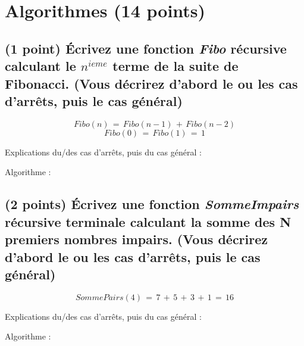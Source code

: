 \documentclass[11pt,a4paper]{article}
\begin{document}


\clearpage

\section{Algorithmes (14 points)}

\subsection{(1 point) \'Ecrivez une fonction \og \textit{Fibo} \fg{} récursive calculant le $ n^{ieme} $ terme de la suite de Fibonacci. (Vous décrirez d'abord le ou les cas d'arrêts, puis le cas général) }


\vspace*{-0.5cm}

\begin{center}

\begin{equation*}
Fibo(n) \, = \, Fibo(n - 1) \, + \, Fibo(n - 2)
\end{equation*}
%
\vspace*{-0.5cm}
%
\begin{equation*}
Fibo(0) \, = \, Fibo(1) \, = \, 1
\end{equation*}

Explications du/des cas d'arrêts, puis du cas général :

\bigskip

Algorithme :
\end{center}


\clearpage


\subsection{(2 points) \'Ecrivez une fonction \og \textit{SommeImpairs} \fg{} récursive terminale calculant la somme des N premiers nombres impairs. (Vous décrirez d'abord le ou les cas d'arrêts, puis le cas général) }

\vspace*{-0.5cm}

\begin{center}

\begin{equation*}
SommePairs(4)  \, = \,  7 \, + \, 5 \, + \, 3 \, + \, 1  \, = \,  16
\end{equation*}

Explications du/des cas d'arrêts, puis du cas général :

\bigskip

Algorithme :
\end{center}
\end{document}

